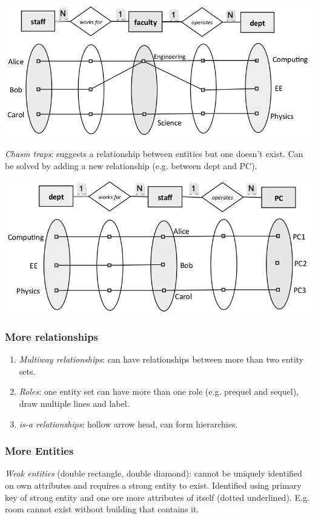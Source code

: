 \documentclass[twocolumn,english]{article}
\begin{document}
\includegraphics[scale=0.2]{img/fan}

\noindent \emph{Chasm traps}: suggests a relationship between entities
but one doesn't exist. Can be solved by adding a new relationship
(e.g. between dept and PC).

\includegraphics[scale=0.2]{img/chasm}


\subsubsection{More relationships}
\begin{enumerate}
\item \emph{Multiway relationships}: can have relationships between more
than two entity sets.
\item \emph{Roles}: one entity set can have more than one role (e.g. prequel
and sequel), draw multiple lines and label.
\item \emph{is-a relationships}: hollow arrow head, can form hierarchies.
\end{enumerate}

\subsubsection{More Entities}

\emph{Weak entities} (double rectangle, double diamond): cannot be
uniquely identified on own attributes and requires a strong entity
to exist. Identified using primary key of strong entity and one ore
more attributes of itself (dotted underlined). E.g. room cannot exist
without building that contains it.
\end{document}
